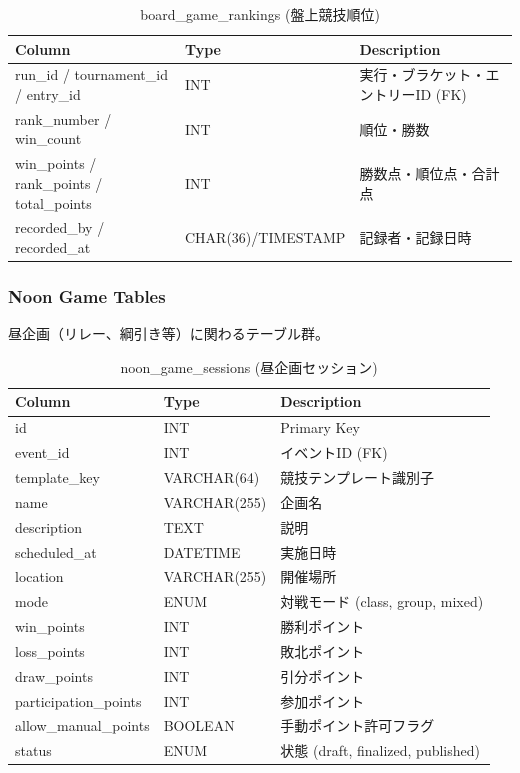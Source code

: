 \documentclass[paper=a4, fontsize=11pt]{jlreq}
\begin{document}
\begin{table}[H]
    \centering
    \caption{board\_game\_rankings (盤上競技順位)}
    \begin{tabularx}{\textwidth}{|l|l|X|}
        \toprule
        Column & Type & Description \\
        \midrule
        run\_id / tournament\_id / entry\_id & INT & 実行・ブラケット・エントリーID (FK) \\
        rank\_number / win\_count & INT & 順位・勝数 \\
        win\_points / rank\_points / total\_points & INT & 勝数点・順位点・合計点 \\
        recorded\_by / recorded\_at & CHAR(36)/TIMESTAMP & 記録者・記録日時 \\
        \bottomrule
    \end{tabularx}
\end{table}

\subsubsection{Noon Game Tables}
昼企画（リレー、綱引き等）に関わるテーブル群。

\begin{table}[H]
    \centering
    \caption{noon\_game\_sessions (昼企画セッション)}
    \begin{tabularx}{\textwidth}{|l|l|X|}
        \toprule
        Column & Type & Description \\
        \midrule
        id & INT & Primary Key \\
        event\_id & INT & イベントID (FK) \\
        template\_key & VARCHAR(64) & 競技テンプレート識別子 \\
        name & VARCHAR(255) & 企画名 \\
        description & TEXT & 説明 \\
        scheduled\_at & DATETIME & 実施日時 \\
        location & VARCHAR(255) & 開催場所 \\
        mode & ENUM & 対戦モード (class, group, mixed) \\
        win\_points & INT & 勝利ポイント \\
        loss\_points & INT & 敗北ポイント \\
        draw\_points & INT & 引分ポイント \\
        participation\_points & INT & 参加ポイント \\
        allow\_manual\_points & BOOLEAN & 手動ポイント許可フラグ \\
        status & ENUM & 状態 (draft, finalized, published) \\
        \bottomrule
    \end{tabularx}
\end{table}
\end{document}
